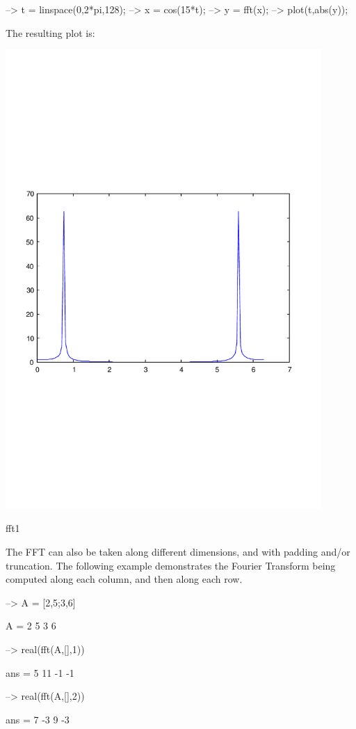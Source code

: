 \begin{DoxyVerbInclude}
--> t = linspace(0,2*pi,128);
--> x = cos(15*t);
--> y = fft(x);
--> plot(t,abs(y));
\end{DoxyVerbInclude}


The resulting plot is\-:  
\begin{DoxyImage}
\includegraphics[width=12cm]{fft1}
\caption{fft1}
\end{DoxyImage}


The F\-F\-T can also be taken along different dimensions, and with padding and/or truncation. The following example demonstrates the Fourier Transform being computed along each column, and then along each row.


\begin{DoxyVerbInclude}
--> A = [2,5;3,6]

A = 
 2 5 
 3 6 

--> real(fft(A,[],1))

ans = 
  5 11 
 -1 -1 

--> real(fft(A,[],2))

ans = 
  7 -3 
  9 -3 
\end{DoxyVerbInclude}


